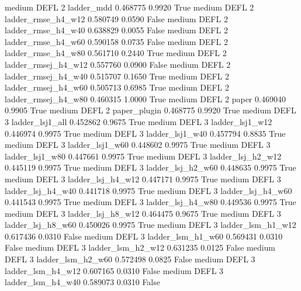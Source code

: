     medium     DEFL                 2          ladder_mdd   0.468775      0.9920    True
    medium     DEFL                 2  ladder_rmse_h4_w12   0.580749      0.0590   False
    medium     DEFL                 2  ladder_rmse_h4_w40   0.638829      0.0055   False
    medium     DEFL                 2  ladder_rmse_h4_w60   0.590158      0.0735   False
    medium     DEFL                 2  ladder_rmse_h4_w80   0.561710      0.2440    True
    medium     DEFL                 2 ladder_rmsej_h4_w12   0.557760      0.0900   False
    medium     DEFL                 2 ladder_rmsej_h4_w40   0.515707      0.1650    True
    medium     DEFL                 2 ladder_rmsej_h4_w60   0.505713      0.6985    True
    medium     DEFL                 2 ladder_rmsej_h4_w80   0.460315      1.0000    True
    medium     DEFL                 2               paper   0.469040      0.9905    True
    medium     DEFL                 2        paper_plugin   0.468775      0.9920    True
    medium     DEFL                 3     ladder_lsj1_all   0.452862      0.9675    True
    medium     DEFL                 3     ladder_lsj1_w12   0.446974      0.9975    True
    medium     DEFL                 3     ladder_lsj1_w40   0.457794      0.8835    True
    medium     DEFL                 3     ladder_lsj1_w60   0.448602      0.9975    True
    medium     DEFL                 3     ladder_lsj1_w80   0.447661      0.9975    True
    medium     DEFL                 3   ladder_lsj_h2_w12   0.445119      0.9975    True
    medium     DEFL                 3   ladder_lsj_h2_w60   0.448635      0.9975    True
    medium     DEFL                 3   ladder_lsj_h4_w12   0.447171      0.9975    True
    medium     DEFL                 3   ladder_lsj_h4_w40   0.441718      0.9975    True
    medium     DEFL                 3   ladder_lsj_h4_w60   0.441543      0.9975    True
    medium     DEFL                 3   ladder_lsj_h4_w80   0.449536      0.9975    True
    medium     DEFL                 3   ladder_lsj_h8_w12   0.464475      0.9675    True
    medium     DEFL                 3   ladder_lsj_h8_w60   0.450026      0.9975    True
    medium     DEFL                 3   ladder_lsm_h1_w12   0.617436      0.0310   False
    medium     DEFL                 3   ladder_lsm_h1_w60   0.569431      0.0310   False
    medium     DEFL                 3   ladder_lsm_h2_w12   0.631235      0.0125   False
    medium     DEFL                 3   ladder_lsm_h2_w60   0.572498      0.0825   False
    medium     DEFL                 3   ladder_lsm_h4_w12   0.607165      0.0310   False
    medium     DEFL                 3   ladder_lsm_h4_w40   0.589073      0.0310   False
